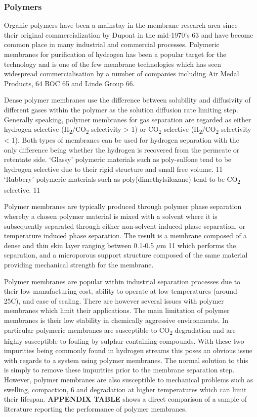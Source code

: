 \subsubsection{Polymers}
Organic polymers have been a mainstay in the membrane research area since their original 
commercialization by Dupont in the mid-1970’s 63  and have become common place in many 
industrial and commercial processes. Polymeric membranes for purification of hydrogen has 
been a popular target for the technology and is one of the few membrane technologies which 
has seen widespread commercialisation by a number of companies including Air Medal Products, 
64 BOC 65 and Linde Group 66.

Dense polymer membranes use the difference between solubility and diffusivity of different 
gases within the polymer as the solution diffusion rate limiting step. Generally speaking, 
polymer membranes for gas separation are regarded as either hydrogen selective (H\textsubscript{2}/CO\textsubscript{2} 
selectivity > 1) or CO\textsubscript{2} selective (H\textsubscript{2}/CO\textsubscript{2} 
selectivity < 1). Both types of membranes can be used for hydrogen separation with the 
only difference being whether the hydrogen is recovered from the permeate or retentate side.  
‘Glassy’ polymeric materials such as poly-sulfone tend to be hydrogen selective due to their 
rigid structure and small free volume. 11 ‘Rubbery’ polymeric materials such as 
poly(dimethylsiloxane) tend to be CO\textsubscript{2} selective. 11

Polymer membranes are typically produced through polymer phase separation whereby a chosen 
polymer material is mixed with a solvent where it is subsequently separated through either 
non-solvent induced phase separation, or temperature induced phase separation. 
The result is a membrane composed of a dense and thin skin layer ranging between 0.1-0.5 
$\mu$m 11 which performs the separation, and a microporous support structure composed of the 
same material providing mechanical strength for the membrane. 

Polymer membranes are popular within industrial separation processes due to their low 
manufacturing cost, ability to operate at low temperatures (around 25\textdegree C), and 
ease of scaling. There are however several issues with polymer membranes which limit their 
applications. The main limitation of polymer membranes is their low stability in chemically 
aggressive environments. In particular polymeric membranes are susceptible to CO\textsubscript{2} 
degradation and are highly susceptible to fouling by sulphur containing compounds. With these 
two impurities being commonly found in hydrogen streams this poses an obvious issue with 
regards to a system using polymer membranes. The normal solution to this is simply to remove 
these impurities prior to the membrane separation step. However, polymer membranes are also 
susceptible to mechanical problems such as swelling, compaction, 6 and degradation at higher 
temperatures which can limit their lifespan. \textbf{APPENDIX TABLE} shows a direct comparison 
of a sample of literature reporting the performance of polymer membranes.

